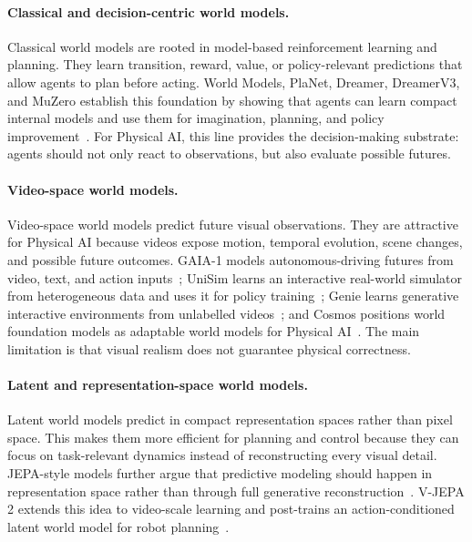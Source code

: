 \paragraph{Classical and decision-centric world models.}
Classical world models are rooted in model-based reinforcement learning and planning. 
They learn transition, reward, value, or policy-relevant predictions that allow agents to plan before acting. 
World Models, PlaNet, Dreamer, DreamerV3, and MuZero establish this foundation by showing that agents can learn compact internal models and use them for imagination, planning, and policy improvement~\citep{ha2018world,hafner2019planet,hafner2020dreamer,hafner2023dreamerv3,schrittwieser2020mastering}. 
For Physical AI, this line provides the decision-making substrate: agents should not only react to observations, but also evaluate possible futures.

\paragraph{Video-space world models.}
Video-space world models predict future visual observations. 
They are attractive for Physical AI because videos expose motion, temporal evolution, scene changes, and possible future outcomes. 
GAIA-1 models autonomous-driving futures from video, text, and action inputs~\citep{hu2023gaia}; UniSim learns an interactive real-world simulator from heterogeneous data and uses it for policy training~\citep{yang2023unisim}; Genie learns generative interactive environments from unlabelled videos~\citep{bruce2024genie}; and Cosmos positions world foundation models as adaptable world models for Physical AI~\citep{agarwal2025cosmos}. 
The main limitation is that visual realism does not guarantee physical correctness.

\paragraph{Latent and representation-space world models.}
Latent world models predict in compact representation spaces rather than pixel space. 
This makes them more efficient for planning and control because they can focus on task-relevant dynamics instead of reconstructing every visual detail. 
JEPA-style models further argue that predictive modeling should happen in representation space rather than through full generative reconstruction~\citep{lecun2022path,assran2023ijepa,bardes2024vjepa}. 
V-JEPA 2 extends this idea to video-scale learning and post-trains an action-conditioned latent world model for robot planning~\citep{assran2025vjepa2}.

